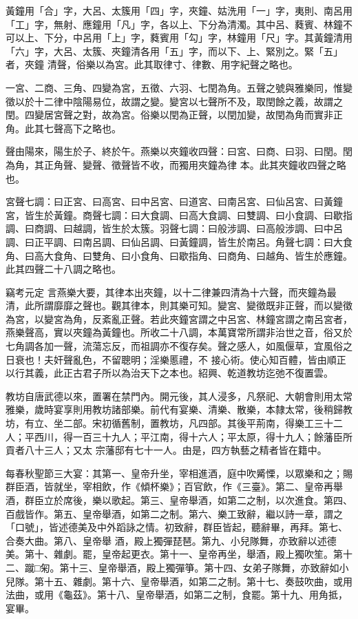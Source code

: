 \begin{pinyinscope}
 黃鐘用「合」字，大呂、太簇用「四」字，夾鐘、姑洗用「一」字，夷則、南呂用「工」字，無射、應鐘用「凡」字，各以上、下分為清濁。其中呂、蕤賓、林鐘不可以上、下分，中呂用「上」字，蕤賓用「勾」字，林鐘用「尺」字。其黃鐘清用「六」字，大呂、太簇、夾鐘清各用「五」字，而以下、上、緊別之。緊「五」者，夾鐘
 清聲，俗樂以為宮。此其取律寸、律數、用字紀聲之略也。



 一宮、二商、三角、四變為宮，五徵、六羽、七閏為角。五聲之號與雅樂同，惟變徵以於十二律中陰陽易位，故謂之變。變宮以七聲所不及，取閏餘之義，故謂之閏。四變居宮聲之對，故為宮。俗樂以閏為正聲，以閏加變，故閏為角而實非正角。此其七聲高下之略也。



 聲由陽來，陽生於子、終於午。燕樂以夾鐘收四聲：曰宮、曰商、曰羽、曰閏。閏為角，其正角聲、變聲、徵聲皆不收，而獨用夾鐘為律
 本。此其夾鐘收四聲之略也。



 宮聲七調：曰正宮、曰高宮、曰中呂宮、曰道宮、曰南呂宮、曰仙呂宮、曰黃鐘宮，皆生於黃鐘。商聲七調：曰大食調、曰高大食調、曰雙調、曰小食調、曰歇指調、曰商調、曰越調，皆生於太簇。羽聲七調：曰般涉調、曰高般涉調、曰中呂調、曰正平調、曰南呂調、曰仙呂調、曰黃鐘調，皆生於南呂。角聲七調：曰大食角、曰高大食角、曰雙角、曰小食角、曰歇指角、曰商角、曰越角、皆生於應鐘。此其四聲二十八調之略也。



 竊考元定
 言燕樂大要，其律本出夾鐘，以十二律兼四清為十六聲，而夾鐘為最清，此所謂靡靡之聲也。觀其律本，則其樂可知。變宮、變徵既非正聲，而以變徵為宮，以變宮為角，反紊亂正聲。若此夾鐘宮謂之中呂宮、林鐘宮謂之南呂宮者，燕樂聲高，實以夾鐘為黃鐘也。所收二十八調，本萬寶常所謂非治世之音，俗又於七角調各加一聲，流蕩忘反，而祖調亦不復存矣。聲之感人，如風偃草，宜風俗之日衰也！夫奸聲亂色，不留聰明；淫樂慝禮，不
 接心術。使心知百體，皆由順正以行其義，此正古君子所以為治天下之本也。紹興、乾道教坊迄弛不復置雲。



 教坊自唐武德以來，置署在禁門內。開元後，其人浸多，凡祭祀、大朝會則用太常雅樂，歲時宴享則用教坊諸部樂。前代有宴樂、清樂、散樂，本隸太常，後稍歸教坊，有立、坐二部。宋初循舊制，置教坊，凡四部。其後平荊南，得樂工三十二人；平西川，得一百三十九人；平江南，得十六人；平太原，得十九人；餘藩臣所貢者八十三人；又太
 宗藩邸有七十一人。由是，四方執藝之精者皆在籍中。



 每春秋聖節三大宴：其第一、皇帝升坐，宰相進酒，庭中吹觱慄，以眾樂和之；賜群臣酒，皆就坐，宰相飲，作《傾杯樂》；百官飲，作《三臺》。第二、皇帝再舉酒，群臣立於席後，樂以歌起。第三、皇帝舉酒，如第二之制，以次進食。第四、百戲皆作。第五、皇帝舉酒，如第二之制。第六、樂工致辭，繼以詩一章，謂之「口號」，皆述德美及中外蹈詠之情。初致辭，群臣皆起，聽辭畢，再拜。第七、合奏大曲。第八、皇帝舉
 酒，殿上獨彈琵琶。第九、小兒隊舞，亦致辭以述德美。第十、雜劇。罷，皇帝起更衣。第十一、皇帝再坐，舉酒，殿上獨吹笙。第十二、蹴□匊。第十三、皇帝舉酒，殿上獨彈箏。第十四、女弟子隊舞，亦致辭如小兒隊。第十五、雜劇。第十六、皇帝舉酒，如第二之制。第十七、奏鼓吹曲，或用法曲，或用《龜茲》。第十八、皇帝舉酒，如第二之制，食罷。第十九、用角抵，宴畢。




\end{pinyinscope}
